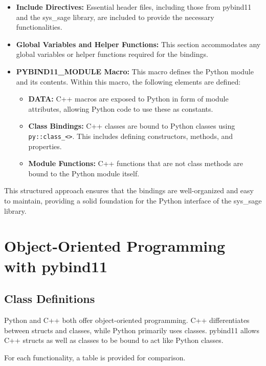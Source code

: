 \begin{itemize}
    \item   \textbf{Include Directives:} Essential header files, including those from pybind11 and the sys\_sage library, are included to provide the necessary functionalities.
    \item   \textbf{Global Variables and Helper Functions:} This section accommodates any global variables or helper functions required for the bindings.
    \item   \textbf{PYBIND11\_MODULE Macro:} This macro defines the Python module and its contents. Within this macro, the following elements are defined:
        \begin{itemize}
            \item   \textbf{DATA:} C++ macros are exposed to Python in form of module attributes, allowing Python code to use these as constants.
            \item   \textbf{Class Bindings:} C++ classes are bound to Python classes using \verb|py::class_<>|. This includes defining constructors, methods, and properties.
            \item   \textbf{Module Functions:} C++ functions that are not class methods are bound to the Python module itself.
        \end{itemize}
\end{itemize}

This structured approach ensures that the bindings are well-organized and easy to maintain, providing a solid foundation for the Python interface of the sys\_sage library.


\section{Object-Oriented Programming with pybind11}

\subsection{Class Definitions}

Python and C++ both offer object-oriented programming. C++ differentiates between structs and classes, while Python primarily uses classes. pybind11 allows C++ structs as well as classes to be bound to act like Python classes.

For each functionality, a table is provided for comparison.
        
